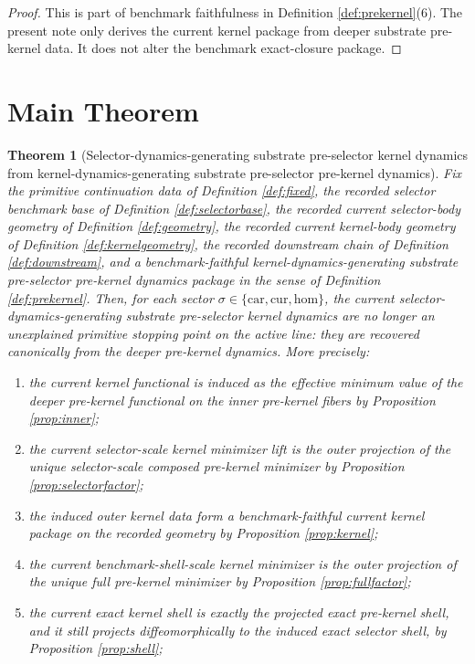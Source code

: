 \documentclass[11pt]{article}
\newcommand{\Car}{\mathrm{car}}
\newcommand{\Cur}{\mathrm{cur}}
\newcommand{\Hom}{\mathrm{hom}}
\newtheorem{theorem}{Theorem}
\begin{document}
\begin{proof}
This is part of benchmark faithfulness in Definition \ref{def:prekernel}(6). The present note only derives the current kernel package from deeper substrate pre-kernel data. It does not alter the benchmark exact-closure package.
\end{proof}

\section{Main Theorem}

\begin{theorem}[Selector-dynamics-generating substrate pre-selector kernel dynamics from kernel-dynamics-generating substrate pre-selector pre-kernel dynamics]
\label{thm:main}
Fix the primitive continuation data of Definition \ref{def:fixed}, the recorded selector benchmark base of Definition \ref{def:selectorbase}, the recorded current selector-body geometry of Definition \ref{def:geometry}, the recorded current kernel-body geometry of Definition \ref{def:kernelgeometry}, the recorded downstream chain of Definition \ref{def:downstream}, and a benchmark-faithful kernel-dynamics-generating substrate pre-selector pre-kernel dynamics package in the sense of Definition \ref{def:prekernel}. Then, for each sector \(\sigma\in\{\Car,\Cur,\Hom\}\), the current selector-dynamics-generating substrate pre-selector kernel dynamics are no longer an unexplained primitive stopping point on the active line: they are recovered canonically from the deeper pre-kernel dynamics. More precisely:
\begin{enumerate}
    \item the current kernel functional is induced as the effective minimum value of the deeper pre-kernel functional on the inner pre-kernel fibers by Proposition \ref{prop:inner};
    \item the current selector-scale kernel minimizer lift is the outer projection of the unique selector-scale composed pre-kernel minimizer by Proposition \ref{prop:selectorfactor};
    \item the induced outer kernel data form a benchmark-faithful current kernel package on the recorded geometry by Proposition \ref{prop:kernel};
    \item the current benchmark-shell-scale kernel minimizer is the outer projection of the unique full pre-kernel minimizer by Proposition \ref{prop:fullfactor};
    \item the current exact kernel shell is exactly the projected exact pre-kernel shell, and it still projects diffeomorphically to the induced exact selector shell, by Proposition \ref{prop:shell};

\end{enumerate}
\end{theorem}
\end{document}
